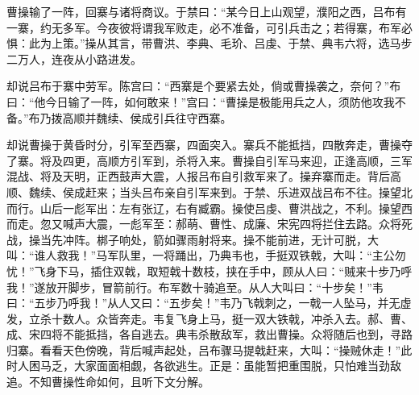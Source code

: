 曹操输了一阵，回寨与诸将商议。于禁曰：“某今日上山观望，濮阳之西，吕布有一寨，约无多军。今夜彼将谓我军败走，必不准备，可引兵击之；若得寨，布军必惧：此为上策。”操从其言，带曹洪、李典、毛玠、吕虔、于禁、典韦六将，选马步二万人，连夜从小路进发。

却说吕布于寨中劳军。陈宫曰：“西寨是个要紧去处，倘或曹操袭之，奈何？”布曰：“他今日输了一阵，如何敢来！”宫曰：“曹操是极能用兵之人，须防他攻我不备。”布乃拨高顺并魏续、侯成引兵往守西寨。

却说曹操于黄昏时分，引军至西寨，四面突入。寨兵不能抵挡，四散奔走，曹操夺了寨。将及四更，高顺方引军到，杀将入来。曹操自引军马来迎，正逢高顺，三军混战、将及天明，正西鼓声大震，人报吕布自引救军来了。操弃寨而走。背后高顺、魏续、侯成赶来；当头吕布亲自引军来到。于禁、乐进双战吕布不往。操望北而行。山后一彪军出：左有张辽，右有臧霸。操使吕虔、曹洪战之，不利。操望西而走。忽又喊声大震，一彪军至：郝萌、曹性、成廉、宋宪四将拦住去路。众将死战，操当先冲阵。梆子响处，箭如骤雨射将来。操不能前进，无计可脱，大叫：“谁人救我！”马军队里，一将踊出，乃典韦也，手挺双铁戟，大叫：“主公勿忧！”飞身下马，插住双戟，取短戟十数枝，挟在手中，顾从人曰：“贼来十步乃呼我！”遂放开脚步，冒箭前行。布军数十骑追至。从人大叫曰：“十步矣！”韦曰：“五步乃呼我！”从人又曰：“五步矣！”韦乃飞戟刺之，一戟一人坠马，并无虚发，立杀十数人。众皆奔走。韦复飞身上马，挺一双大铁戟，冲杀入去。郝、曹、成、宋四将不能抵挡，各自逃去。典韦杀散敌军，救出曹操。众将随后也到，寻路归寨。看看天色傍晚，背后喊声起处，吕布骤马提戟赶来，大叫：“操贼休走！”此时人困马乏，大家面面相觑，各欲逃生。正是：虽能暂把重围脱，只怕难当劲敌追。不知曹操性命如何，且听下文分解。